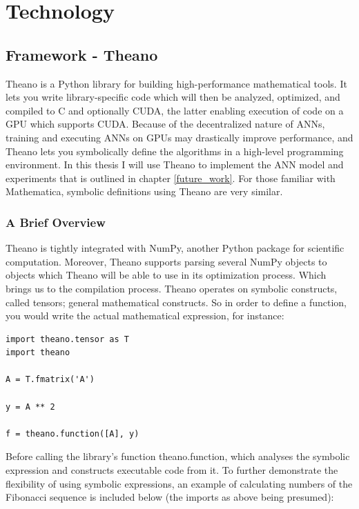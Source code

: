 
\chapter{Technology}\label{chpt:tech}
\section{Framework - Theano}

Theano is a Python library for building high-performance mathematical tools. It lets you write library-specific code which will then be analyzed, optimized, and compiled to C and optionally CUDA, the latter enabling execution of code on a GPU which supports CUDA. Because of the decentralized nature of ANNs, training and executing ANNs on GPUs may drastically improve performance, and Theano lets you symbolically define the algorithms in a high-level programming environment. In this thesis I will use Theano to implement the ANN model and experiments that is outlined in chapter \ref{future_work}. For those familiar with Mathematica, symbolic definitions using Theano are very similar.

\subsection{A Brief Overview}

Theano is tightly integrated with NumPy, another Python package for scientific computation. Moreover, Theano supports parsing several NumPy objects to objects which Theano will be able to use in its optimization process. Which brings us to the compilation process.
Theano operates on symbolic constructs, called tensors; general mathematical constructs. So in order to define a function, you would write the actual mathematical expression, for instance:

\begin{verbatim}
import theano.tensor as T
import theano

A = T.fmatrix('A')

y = A ** 2

f = theano.function([A], y)
\end{verbatim}

Before calling the library's function theano.function, which analyses the symbolic expression and constructs executable code from it. To further demonstrate the flexibility of using symbolic expressions, an example of calculating numbers of the Fibonacci sequence is included below (the imports as above being presumed):

